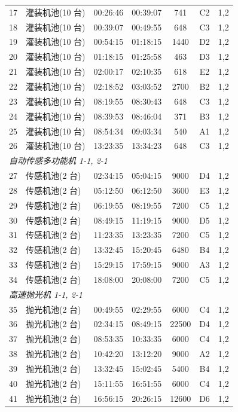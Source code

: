 \documentclass[12pt,a4paper]{ctexart}
\begin{document}
\begin{longtable}{c p{4.2cm} c c c c c}
17 & 灌装机池(10 台) & 00:26:46 & 00:39:07 & 741 & C2 & 1,2 \\
18 & 灌装机池(10 台) & 00:39:07 & 00:49:55 & 648 & C3 & 1,2 \\
19 & 灌装机池(10 台) & 00:54:15 & 01:18:15 & 1440 & D2 & 1,2 \\
20 & 灌装机池(10 台) & 01:18:15 & 01:25:58 & 463 & D3 & 1,2 \\
21 & 灌装机池(10 台) & 02:00:17 & 02:10:35 & 618 & E2 & 1,2 \\
22 & 灌装机池(10 台) & 02:18:52 & 03:03:52 & 2700 & B2 & 1,2 \\
23 & 灌装机池(10 台) & 08:19:55 & 08:30:43 & 648 & C3 & 1,2 \\
24 & 灌装机池(10 台) & 08:39:53 & 08:46:04 & 371 & B3 & 1,2 \\
25 & 灌装机池(10 台) & 08:54:34 & 09:03:34 & 540 & A1 & 1,2 \\
26 & 灌装机池(10 台) & 13:23:35 & 13:34:23 & 648 & C3 & 1,2 \\
\midrule
\multicolumn{7}{l}{\textit{自动传感多功能机 1-1, 2-1}}\\
27 & 传感机池(2 台) & 02:34:15 & 05:04:15 & 9000 & D4 & 1,2 \\
28 & 传感机池(2 台) & 05:12:50 & 06:12:50 & 3600 & E3 & 1,2 \\
29 & 传感机池(2 台) & 06:19:55 & 08:19:55 & 7200 & C5 & 1,2 \\
30 & 传感机池(2 台) & 08:49:15 & 11:19:15 & 9000 & D5 & 1,2 \\
31 & 传感机池(2 台) & 11:23:35 & 13:23:35 & 7200 & C5 & 1,2 \\
32 & 传感机池(2 台) & 13:32:45 & 15:20:45 & 6480 & B4 & 1,2 \\
33 & 传感机池(2 台) & 15:29:15 & 17:59:15 & 9000 & A3 & 1,2 \\
34 & 传感机池(2 台) & 18:08:00 & 20:08:00 & 7200 & C5 & 1,2 \\
\midrule
\multicolumn{7}{l}{\textit{高速抛光机 1-1, 2-1}}\\
35 & 抛光机池(2 台) & 00:49:55 & 02:29:55 & 6000 & C4 & 1,2 \\
36 & 抛光机池(2 台) & 02:34:15 & 08:49:15 & 22500 & D4 & 1,2 \\
37 & 抛光机池(2 台) & 08:53:35 & 10:33:35 & 6000 & C4 & 1,2 \\
38 & 抛光机池(2 台) & 10:42:20 & 13:12:20 & 9000 & A2 & 1,2 \\
39 & 抛光机池(2 台) & 13:32:45 & 15:02:45 & 5400 & B4 & 1,2 \\
40 & 抛光机池(2 台) & 15:11:55 & 16:51:55 & 6000 & C4 & 1,2 \\
41 & 抛光机池(2 台) & 16:56:15 & 20:26:15 & 12600 & D6 & 1,2 \\
\end{longtable}
\end{document}
